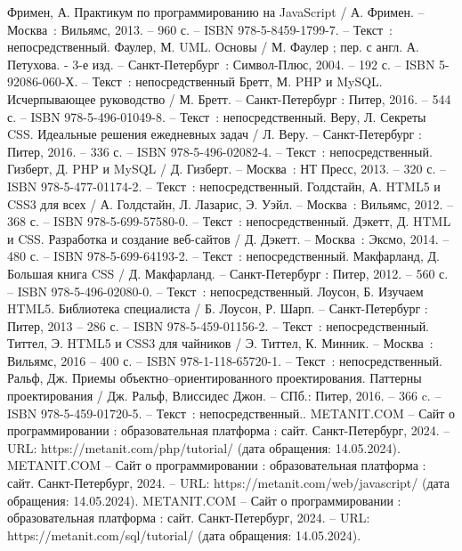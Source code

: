 
\begin{thebibliography}{20}
     Фримен, А. Практикум по программированию на JavaScript / А. Фримен. – Москва~: Вильямс, 2013. – 960 с. – ISBN 978-5-8459-1799-7. – Текст~: непосредственный.
   	 Фаулер, М. UML. Основы /  М. Фаулер ; пер. с англ. А. Петухова. - 3-е изд. – Санкт-Петербург~: Символ-Плюс, 2004. – 192 с. – ISBN 5-92086-060-Х. – Текст~: непосредственный
     Бретт, М. PHP и MySQL. Исчерпывающее руководство / М. Бретт. – Санкт-Петербург : Питер, 2016. – 544 с. – ISBN 978-5-496-01049-8. – Текст~: непосредственный.
     Веру, Л. Секреты CSS. Идеальные решения ежедневных задач / Л. Веру. – Санкт-Петербург : Питер, 2016. – 336 с. – ISBN 978-5-496-02082-4. – Текст~: непосредственный.
    	Гизберт, Д. PHP и MySQL / Д. Гизберт. – Москва~: НТ Пресс, 2013. – 320 с. – ISBN 978-5-477-01174-2. – Текст~: непосредственный.
		Голдстайн, А. HTML5 и CSS3 для всех / А. Голдстайн, Л. Лазарис, Э. Уэйл. – Москва~: Вильямс, 2012. – 368 с. – ISBN 978-5-699-57580-0. – Текст~: непосредственный.
	 Дэкетт, Д. HTML и CSS. Разработка и создание веб-сайтов / Д. Дэкетт. – Москва~: Эксмо, 2014. – 480 с. – ISBN 978-5-699-64193-2. – Текст~: непосредственный.
	 Макфарланд, Д. Большая книга CSS / Д. Макфарланд. – Санкт-Петербург : Питер, 2012. – 560 с. – ISBN 978-5-496-02080-0. – Текст~: непосредственный.
	 Лоусон, Б. Изучаем HTML5. Библиотека специалиста / Б. Лоусон, Р. Шарп. – Санкт-Петербург : Питер, 2013 – 286 с. – ISBN 978-5-459-01156-2. – Текст~: непосредственный.
	 Титтел, Э. HTML5 и CSS3 для чайников / Э. Титтел, К. Минник. – Москва~: Вильямс, 2016 – 400 с. – ISBN 978-1-118-65720-1. – Текст~: непосредственный.
	 Ральф, Дж. Приемы объектно–ориентированного проектирования. Паттерны проектирования / Дж. Ральф, Влиссидес Джон. – СПб.: Питер, 2016. – 366 c. – ISBN 978-5-459-01720-5. – Текст~: непосредственный..
	 METANIT.COM – Сайт о программировании : образовательная платформа : сайт. Санкт-Петербург, 2024. – URL: https://metanit.com/php/tutorial/ (дата обращения: 14.05.2024).
	 METANIT.COM – Сайт о программировании : образовательная платформа : сайт. Санкт-Петербург, 2024. – URL: https://metanit.com/web/javascript/ (дата обращения: 14.05.2024).
	 METANIT.COM – Сайт о программировании : образовательная платформа : сайт. Санкт-Петербург, 2024. – URL: https://metanit.com/sql/tutorial/ (дата обращения: 14.05.2024).

\end{thebibliography}
